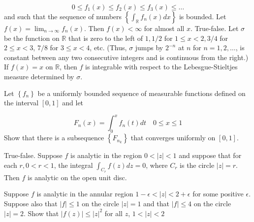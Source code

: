 \documentclass[14pt]{extarticle}
\begin{document}
$$
0 \leq f_{1}(x) \leq f_{2}(x) \leq f_{3}(x) \leq \ldots
$$
and such that the sequence of numbers $\left\{\int_{\mathbb{R}} f_{n}(x) d x\right\}$ is bounded. Let $f(x)=\lim _{n \rightarrow \infty} f_{n}(x)$. Then $f(x)<\infty$ for almost all $x .$
\newpage
True-false. Let $\sigma$ be the function on $\mathbb{R}$ that is zero to the left of $1,1 / 2$ for $1 \leq x<2,3 / 4$ for $2 \leq x<3$, $7 / 8$ for $3 \leq x<4$, etc. (Thus, $\sigma$ jumps by $2^{-n}$ at $n$ for $n=1,2, \ldots$, is constant between any two consecutive integers and is continuous from the right.) If $f(x)=x$ on $\mathbb{R}$, then $f$ is integrable with respect to the Lebesgue-Stieltjes measure determined by $\sigma$.
\newpage

Let $\left\{f_{n}\right\}$ be a uniformly bounded sequence of measurable functions defined on the interval $[0,1]$ and let

$$
F_{n}(x)=\int_{0}^{x} f_{n}(t) d t \quad 0 \leq x \leq 1
$$
Show that there is a subsequence $\left\{F_{n_{k}}\right\}$ that converges uniformly on $[0,1]$.
\newpage

True-false. Suppose $f$ is analytic in the region $0<|z|<1$ and suppose that for each $r, 0<r<1$, the integral $\int_{C_{r}} f(z) d z=0$, where $C_{r}$ is the circle $|z|=r$. Then $f$ is analytic on the open unit disc.
\newpage

Suppose $f$ is analytic in the annular region $1-\epsilon<|z|<2+\epsilon$ for some positive $\epsilon$. Suppose also that $|f| \leq 1$ on the circle $|z|=1$ and that $|f| \leq 4$ on the circle $|z|=2$. Show that $|f(z)| \leq|z|^{2}$ for all $z$, $1<|z|<2$
\newpage
\end{document}
